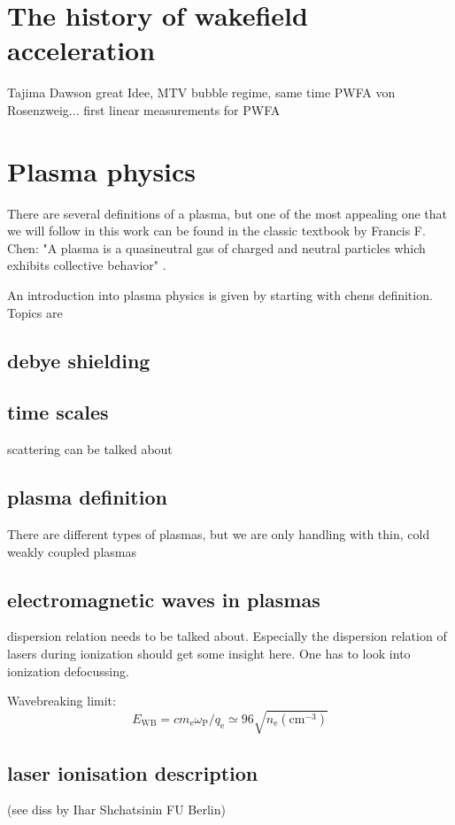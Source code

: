 
\section{The history of wakefield acceleration}
Tajima Dawson great Idee, MTV bubble regime, same time PWFA von Rosenzweig... first linear measurements for PWFA
\section{Plasma physics}
There are several definitions of a plasma, but one of the most appealing one that we will follow in this work can be found in the classic 
textbook by Francis F. Chen:
"A plasma is a quasineutral gas of charged and neutral particles which
exhibits collective behavior" \cite{Chen_book_Plasma}.



An introduction into plasma physics is given by starting with chens definition. Topics are
\subsection{debye shielding}
\subsection{time scales}
scattering can be talked about

\subsection{plasma definition}
There are different types of plasmas, but we are only handling with thin, cold  weakly coupled plasmas
\subsection{electromagnetic waves in plasmas}
dispersion relation needs to be talked about. Especially the dispersion relation of lasers during ionization should get some insight here. One has to look into ionization defocussing.  

Wavebreaking limit: \begin{equation}
E_\mathrm{WB}=cm_\mathrm{e}\omega_\mathrm{P}/q_\mathrm{e}\simeq 96 \sqrt{n_\mathrm{e}(\mathrm{cm}^{-3})}
\end{equation}

\subsection{laser ionisation description}
(see diss by Ihar Shchatsinin FU Berlin)

